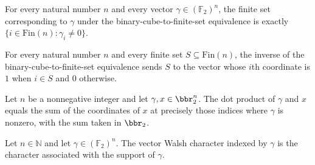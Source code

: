 \begin{theorem}
\leanok
{}
For every natural number $n$ and every vector $\gamma\in(\mathbb{F}_2)^n$, the finite
set corresponding to $\gamma$ under the binary-cube-to-finite-set equivalence is exactly
$\{i\in\mathrm{Fin}(n):\gamma_i\ne0\}$.
\end{theorem}

\begin{theorem}
\leanok
{}
For every natural number $n$ and every finite set $S\subseteq\mathrm{Fin}(n)$, the
inverse of the binary-cube-to-finite-set equivalence sends $S$ to the vector whose $i$th
coordinate is $1$ when $i\in S$ and $0$ otherwise.
\end{theorem}

\begin{theorem}
\leanok
{}
Let $n$ be a nonnegative integer and let $\gamma,x\in\bbr_2^n$. The dot product of
$\gamma$ and $x$ equals the sum of the coordinates of $x$ at precisely those indices
where $\gamma$ is nonzero, with the sum taken in $\bbr_2$.
\end{theorem}

\begin{definition}
\label{FABL.vectorWalshCharacter}
\leanok
{}
Let $n\in\mathbb{N}$ and let $\gamma\in(\mathbb{F}_2)^n$. The vector Walsh character
indexed by $\gamma$ is the character associated with the support of $\gamma$.
\end{definition}

